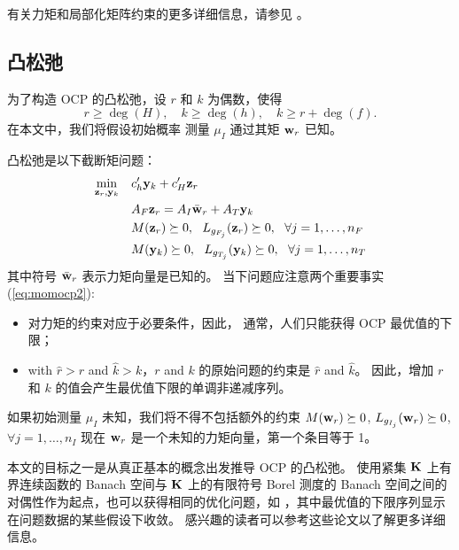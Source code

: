 \begin{translation}
有关力矩和局部化矩阵约束的更多详细信息，请参见 \cite{Las2001}。

\subsection{凸松弛}
为了构造 OCP 的凸松弛，设 $r$ 和 $k$ 为偶数，使得
\begin{equation}\nonumber
r\geq\deg(H), \quad k\geq\deg(h), \quad k\geq r+\deg(f).
\end{equation}
在本文中，我们将假设初始概率
测量 $\mu_I$ 通过其矩 $\mathbf{w}_r$ 已知。

凸松弛是以下截断矩问题：
\begin{equation}\label{eq:momocp2}
\begin{split}
\min_{\mathbf{z}_r, \mathbf{y}_k}\quad & c_h' \mathbf{y}_k+  c_H' \mathbf{z}_r \\
& A_F \mathbf{z}_r = A_I \bar {\mathbf{w}}_r + A_T \mathbf{y}_k \\
& M(\mathbf{z}_r)\succeq 0, ~~ L_{g_{F_j}}(\mathbf{z}_r)\succeq 0, ~~ \forall j=1,\dots,n_F \\
& M(\mathbf{y}_k)\succeq 0, ~~ L_{g_{T_j}}(\mathbf{y}_k)\succeq 0, ~~ \forall j=1,\dots,n_T
\end{split}
\end{equation}
其中符号 $\bar {\mathbf{w}}_r$ 表示力矩向量是已知的。
当下问题应注意两个重要事实 (\ref{eq:momocp2}):
\begin{itemize}
  \item 对力矩的约束对应于必要条件，因此，
  通常，人们只能获得 OCP 最优值的下限；
  \item with $\hat r > r$ and $\hat k > k$，$r$ and $k$ 的原始问题的约束是 $\hat r$ and $\hat{k}$。 因此，增加 $r$ 和 $k$ 的值会产生最优值下限的单调非递减序列。
  \end{itemize}

\begin{remark}
  如果初始测量 $\mu_I$ 未知，我们将不得不包括额外的约束 $M(\mathbf{w}_r)\succeq 0$, $L_{g_{I_j}}(\mathbf{w}_r)\succeq 0$, $\forall j=1,\dots,n_I$ 现在 $\mathbf{w}_r$ 是一个未知的力矩向量，第一个条目等于 1。
\end{remark}

\begin{remark}
  本文的目标之一是从真正基本的概念出发推导 OCP 的凸松弛。 使用紧集 $\mathbf{K}$ 上有界连续函数的 Banach 空间与 $\mathbf{K}$ 上的有限符号 Borel 测度的 Banach 空间之间的对偶性作为起点，也可以获得相同的优化问题，如 \cite{LasPriHen2005,LasHenPriTre2008}，其中最优值的下限序列显示在问题数据的某些假设下收敛。 感兴趣的读者可以参考这些论文以了解更多详细信息。
\end{remark}


\end{translation}
